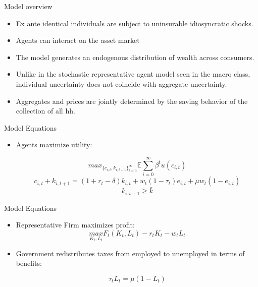 \documentclass{beamer}
\begin{document}
\begin{frame}{Model overview}
	\begin{itemize}
	
	\item {
	Ex ante identical individuals are subject to uninsurable idiosyncratic shocks. 
	}
	\item {
Agents can interact on the asset market
	}
	\item {
The model generates an endogenous distribution of wealth across consumers. 
	}	
	\item {
Unlike in the stochastic representative agent model seen in the macro class, individual uncertainty does not coincide with aggregate uncertainty. 
	}
	\item {
Aggregates and prices are jointly determined by the saving behavior of the collection of all hh. 
}

	\end{itemize}

\end{frame}


\begin{frame}{Model Equations}
	\begin{itemize}
	
	\item {
	Agents maximize utility:
	}

\[ 
max_{\{{ c_{i,t}, k_{i,t+1} }\}_{t = 0}^{\infty}} {\mathbb{E}} \sum_{i=0}^{\infty} \beta^{t}  u(c_{i,t}) 
\]
 \[ 
 c_{i,t} + k_{i,t+1} = (1 + r_{t} - \delta) k_{i,t} + w_{t} (1 - \tau_{t})  e_{i,t} + \mu w_{t} (1 - e_{i,t})
 \]
  \[
  k_{i,t + 1} \geq \bar{k}
	\]


	\end{itemize}

\end{frame}

\begin{frame}{Model Equations}
	\begin{itemize}
	
	\item {
	Representative Firm maximizes profit:
	}
\[ 
\underset{K_{t},L_{t}}{max} F_{t}(K_{t},L_{t}) -r_{t}K_{t} - w_{t}L_{t}
\]

	\item {
	Government redistributes taxes from employed to unemployed in terms of benefits:
	}

\[ 
\tau_{t}L_{t} = \mu(1-L_{t})
\]

	\end{itemize}

\end{frame}
\end{document}
